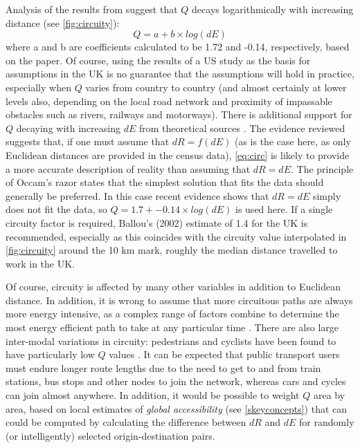 \documentclass[a4paper, 11pt, twoside]{Thesis}
\begin{document}
Analysis of the results from \citet{Levinson2009} suggest that $Q$ decays
logarithmically with increasing distance (see \cref{fig:circuity}):
\begin{equation}
Q = a + b \times log(dE)
\label{eq:circ}
\end{equation}
where a and b are coefficients calculated to be 1.72 and -0.14, respectively,
based on the \citet{Levinson2009} paper. Of course, using the results of
a US study as the basis for assumptions in the UK is no guarantee that the
assumptions will hold in practice, especially when
$Q$ varies from country to country (and almost certainly at lower levels also,
depending on the local road network and proximity of impassable obstacles
such as rivers, railways and motorways). There is additional support
for $Q$ decaying with increasing $dE$ from 
theoretical sources \citep{Barthelemy2011}.
The evidence reviewed suggests that, if one must
assume that $dR = f(dE)$ (as is the case here, as only Euclidean distances are
provided in the census data), \cref{eq:circ} is likely to
provide a more accurate description of reality than assuming that $dR = dE$.
The principle of Occam's razor states that the simplest solution that
fits the data should generally be preferred. In this case
recent evidence shows that $dR = dE$ simply
does not fit the data, so $Q = 1.7 + -0.14 \times log(dE)$
is used here. If a single circuity factor is required, Ballou's (2002) estimate
of 1.4 for the UK is recommended, especially as this coincides
with the circuity value interpolated in \cref{fig:circuity} around the 10 km
mark, roughly the median distance travelled to work in the UK.

Of course, circuity is affected by many other variables in addition to
Euclidean distance. In addition, it is wrong to assume that
more circuitous paths are always more energy intensive, as a complex
range of factors combine to determine the most energy efficient path
to take at any particular time \citep{Ericsson2006}. There are also large
inter-modal variations in circuity: pedestrians
and cyclists have been found to have particularly low $Q$ values \citep{Iacono2010}.
It can be expected that public transport users must endure longer route lengths
due to the need to get to and from train stations, bus stops and other
nodes to join the network, whereas cars and cycles can join almost anywhere.
In addition, it would be possible to weight $Q$ area by area, based on local
estimates of \emph{global accessibility} (see \cref{skeyconcepts})
that can could be computed by calculating the difference between $dR$ and
$dE$ for randomly (or intelligently) selected origin-destination pairs.
\end{document}
